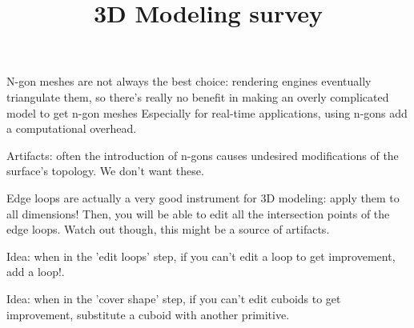 \documentclass{article}
\title{3D Modeling survey}
\begin{document}
\maketitle

N-gon meshes are not always the best choice: rendering engines eventually triangulate them, so there's really no benefit in making an overly complicated model to get n-gon meshes
Especially for real-time applications, using n-gons add a computational overhead.

Artifacts: often the introduction of n-gons causes undesired modifications of the surface's topology. We don't want these.

Edge loops are actually a very good instrument for 3D modeling: apply them to all dimensions! Then, you will be able to edit all the intersection points of the edge loops.
Watch out though, this might be a source of artifacts.

Idea: when in the 'edit loops' step, if you can't edit a loop to get improvement, add a loop!.

Idea: when in the 'cover shape' step, if you can't edit cuboids to get improvement, substitute a cuboid with another primitive.
\end{document}
